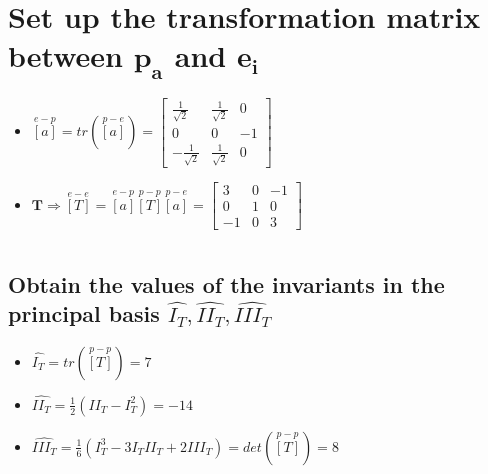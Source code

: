 \documentclass[10pt, letterpaper]{article}
\begin{document}
\section{Set up the transformation matrix between $\bm{p_a}$ and $\bm{e_i}$}
	\begin{itemize}	
		\item $\overset{e-p}{[a]} = tr \left( \overset{p-e}{[a]} \right)= \begin{bmatrix} 
			\frac{1}{\sqrt{2}} & \frac{1}{\sqrt{2}} & 0 \\
			0& 0 & -1 \\
			-\frac{1}{\sqrt{2}} & \frac{1}{\sqrt{2}} & 0
			\end{bmatrix}$
			
		\item $\bm{T} \Rightarrow \overset{e-e}{[T]} = \overset{e-p}{[a]} \overset{p-p}{[T]} \overset{p-e}{[a]}
			= \begin{bmatrix}	3 & 0 & -1 \\
							0 & 1 & 0 \\
							-1 & 0 & 3
						\end{bmatrix}$			
	\end{itemize}
	
\section{}
	\subsection {Obtain the values of the invariants in the principal basis $\hat{I_T}, \hat{II_T}, \hat{III_T}$}
		\begin{itemize}
		\item $\hat{I_T}  = tr\left( \overset{p-p}{[T]} \right) = 7$
		\item $\hat{II_T} = \frac{1}{2}(II_T - I^2_T) = -14 $
		\item $\hat{III_T} = \frac{1}{6}(I^3_T - 3I_T II_T + 2III_T) = det\left(\overset{p-p}{[T]} \right) = 8$
		\end{itemize}
\end{document}
